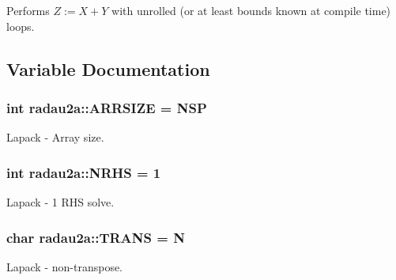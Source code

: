 Performs $Z:= X + Y$ with unrolled (or at least bounds known at compile time) loops. 



\subsection{Variable Documentation}
\subsubsection[{\texorpdfstring{A\+R\+R\+S\+I\+ZE}{ARRSIZE}}]{\setlength{\rightskip}{0pt plus 5cm}int radau2a\+::\+A\+R\+R\+S\+I\+ZE = N\+SP\hspace{0.3cm}{\ttfamily [static]}}\hypertarget{namespaceradau2a_ad00dd88322d09c410e8e5b9af87af14c}{}\label{namespaceradau2a_ad00dd88322d09c410e8e5b9af87af14c}


Lapack -\/ Array size. 

\subsubsection[{\texorpdfstring{N\+R\+HS}{NRHS}}]{\setlength{\rightskip}{0pt plus 5cm}int radau2a\+::\+N\+R\+HS = 1\hspace{0.3cm}{\ttfamily [static]}}\hypertarget{namespaceradau2a_a67ae7402ff0a6a919cfc653405f513e0}{}\label{namespaceradau2a_a67ae7402ff0a6a919cfc653405f513e0}


Lapack -\/ 1 R\+HS solve. 

\subsubsection[{\texorpdfstring{T\+R\+A\+NS}{TRANS}}]{\setlength{\rightskip}{0pt plus 5cm}char radau2a\+::\+T\+R\+A\+NS = \textquotesingle{}N\textquotesingle{}\hspace{0.3cm}{\ttfamily [static]}}\hypertarget{namespaceradau2a_ac3a739e01fca1200932ac123dc0bf0fa}{}\label{namespaceradau2a_ac3a739e01fca1200932ac123dc0bf0fa}


Lapack -\/ non-\/transpose. 

